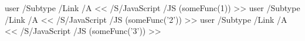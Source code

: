 \documentclass[a4paper,10pt]{article}
\begin{document}
\leavevmode
\pdfstartlink%
user {
    /Subtype /Link
    /A <<
        /S/JavaScript
        /JS (someFunc(1))
    >>
}\phantom{\rule{20pt}{20pt}}\pdfendlink
\pdfstartlink%
user {
    /Subtype /Link
    /A <<
        /S/JavaScript
        /JS (someFunc('2'))
    >>
}\phantom{\rule{20pt}{20pt}}\pdfendlink
\pdfstartlink%
user {
    /Subtype /Link
    /A <<
        /S/JavaScript
        /JS (someFunc('3'))
    >>
}\phantom{\rule{20pt}{20pt}}\pdfendlink
\end{document}
